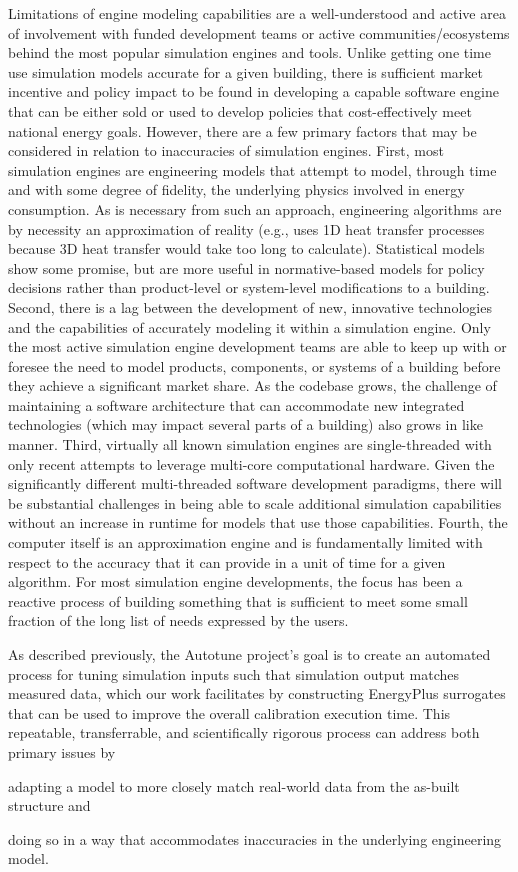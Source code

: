 \documentclass[preprint, review, 12pt]{elsarticle}
\begin{document}
Limitations of engine modeling capabilities are a well-understood and active area of involvement with funded development teams or active communities/ecosystems behind the most popular simulation engines and tools. Unlike getting one time use simulation models accurate for a given building, there is sufficient market incentive and policy impact to be found in developing a capable software engine that can be either sold or used to develop policies that cost-effectively meet national energy goals. However, there are a few primary factors that may be considered in relation to inaccuracies of simulation engines. First, most simulation engines are engineering models that attempt to model, through time and with
some degree of fidelity, the underlying physics involved in energy consumption. As is necessary from such an approach, engineering algorithms are by necessity an approximation of reality (e.g., uses 1D heat transfer processes because 3D heat transfer would take too long to calculate). Statistical models show some promise, but are more useful in normative-based models for policy decisions rather than product-level or system-level modifications to a building. Second, there is a lag between the development of new, innovative technologies and the capabilities of accurately modeling it within a simulation engine. Only the most active simulation engine development teams are able to keep up with or foresee the need to model products, components, or systems of a building before they achieve a significant market share. As the codebase grows, the challenge of maintaining a software architecture that can accommodate new integrated technologies (which may impact several parts of a building) also grows in like manner. Third, virtually all known simulation engines are single-threaded with only recent attempts to leverage multi-core computational hardware. Given the significantly different multi-threaded software development paradigms, there will be substantial challenges in being able to scale additional simulation capabilities without an increase in runtime for models that use those capabilities. Fourth, the computer itself is an approximation engine and is fundamentally limited with respect to the accuracy that it can provide in a unit of time for a given algorithm. For most simulation engine developments, the focus has been a reactive process of building something that is sufficient to meet some small fraction of the long list of needs expressed by the users.

As described previously, the Autotune project's \cite{cit:new2012} goal is to create an automated process for tuning simulation inputs such that simulation output matches measured data, which our work facilitates by constructing EnergyPlus surrogates that can be used to improve the overall calibration execution time. This repeatable, transferrable, and scientifically rigorous process can address both primary issues by 
\begin{inparaenum}[1)]
\item adapting a model to more closely match real-world data from the as-built structure and 
\item doing so in a way that accommodates inaccuracies in the underlying engineering
model.
\end{inparaenum}
\end{document}
